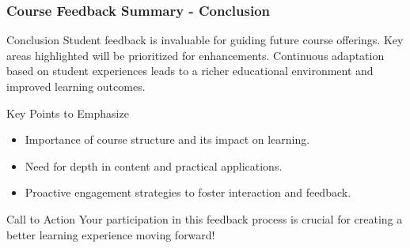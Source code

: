 \documentclass[aspectratio=169]{beamer}
\begin{document}
\begin{frame}[fragile]
    \frametitle{Course Feedback Summary - Conclusion}
    \begin{block}{Conclusion}
        Student feedback is invaluable for guiding future course offerings. 
        Key areas highlighted will be prioritized for enhancements. 
        Continuous adaptation based on student experiences leads to 
        a richer educational environment and improved learning outcomes. 
    \end{block}
    
    \begin{block}{Key Points to Emphasize}
        \begin{itemize}
            \item Importance of course structure and its impact on learning.
            \item Need for depth in content and practical applications.
            \item Proactive engagement strategies to foster interaction and feedback.
        \end{itemize}
    \end{block}
    
    \begin{block}{Call to Action}
        \small{Your participation in this feedback process is crucial for creating a better learning experience moving forward!}
    \end{block}
\end{frame}
\end{document}
